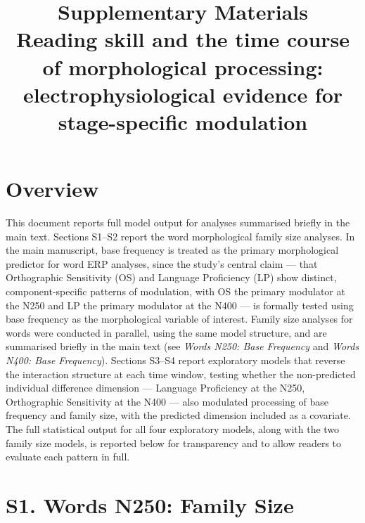 \documentclass[11pt]{article}
\title{Supplementary Materials\\[4pt]
\large Reading skill and the time course of morphological processing: electrophysiological evidence for stage-specific modulation}
\author{}
\date{}
\begin{document}
\maketitle
\thispagestyle{empty}

\section*{Overview}

This document reports full model output for analyses summarised briefly in the main text. Sections S1--S2 report the word morphological family size analyses. In the main manuscript, base frequency is treated as the primary morphological predictor for word ERP analyses, since the study's central claim --- that Orthographic Sensitivity (OS) and Language Proficiency (LP) show distinct, component-specific patterns of modulation, with OS the primary modulator at the N250 and LP the primary modulator at the N400 --- is formally tested using base frequency as the morphological variable of interest. Family size analyses for words were conducted in parallel, using the same model structure, and are summarised briefly in the main text (see \emph{Words N250: Base Frequency} and \emph{Words N400: Base Frequency}). Sections S3--S4 report exploratory models that reverse the interaction structure at each time window, testing whether the non-predicted individual difference dimension --- Language Proficiency at the N250, Orthographic Sensitivity at the N400 --- also modulated processing of base frequency and family size, with the predicted dimension included as a covariate. The full statistical output for all four exploratory models, along with the two family size models, is reported below for transparency and to allow readers to evaluate each pattern in full.

\section*{S1. Words N250: Family Size}
\end{document}
